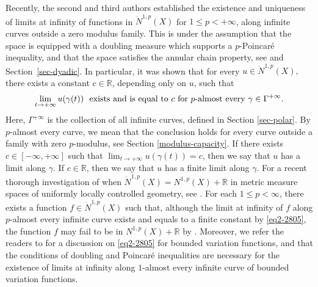 \documentclass[10pt]{amsart}
\numberwithin{equation}{section}
\newcommand{\R}{\mathbb{R}}
\begin{document}
 Recently, the second and third authors established the existence and uniqueness of limits at infinity of functions in $\dot N^{1,p}(X)$ for $1\le p<+\infty$, along infinite curves outside a zero modulus family.  This is under the assumption that the  space is equipped with a doubling measure which supports a $p$-Poincar\'e inequality, and that the space satisfies the annular chain property, see \cite{KN22} and Section~\ref{sec-dyadic}. 
 In particular, it was shown that for every $u\in \dot N^{1,p}(X),$ there exists a constant $c\in\mathbb R$, depending only on $u$, such that 
 	\begin{equation}\label{eq2-2805}
	\lim_{t\to{+\infty}}u(\gamma(t)) \text{\rm \ \ exists and is equal to $c$ for $p$-almost every $\gamma\in\Gamma^{+\infty}$}.
	\end{equation}
Here, $\Gamma^{+\infty}$ is the collection of all infinite curves, defined in Section \ref{sec-polar}. By $p$-almost every curve, we mean that the conclusion holds for every curve outside a family with zero $p$-modulus, see Section \ref{modulus-capacity}. 
If there exists $c\in[-\infty,+\infty]$ such that $\lim_{t\to+\infty}u(\gamma(t))=c$, then we say that $u$ has a limit along $\gamma$.  If $c\in\R$, then we say that $u$ has a finite limit along $\gamma$. For a recent thorough investigation of when $\dot N^{1,p}(X)=N^{1,p}(X)+\mathbb{R}$ in metric measure spaces of uniformly locally controlled geometry, see \cite{GKS24}. For each $1\leq p <\infty$, there exists a function $f\in \dot N^{1,p}(X)$ 
{ such that, although}
 the limit at infinity of $f$ along $p$-almost every infinite curve exists and equals to a finite constant by \eqref{eq2-2805}, the function $f$ may fail to be in $N^{1,p}(X)+\mathbb R$ by \cite[Theorem 1.1]{GKS24}.
Moreover, we refer the readers to  \cite{LN24} for a discussion on \eqref{eq2-2805} for bounded variation functions, and that the conditions of doubling and Poincar\'e inequalities are{
necessary} for the existence of limits at infinity along $1$-almost every infinite curve of bounded variation functions.
\end{document}

